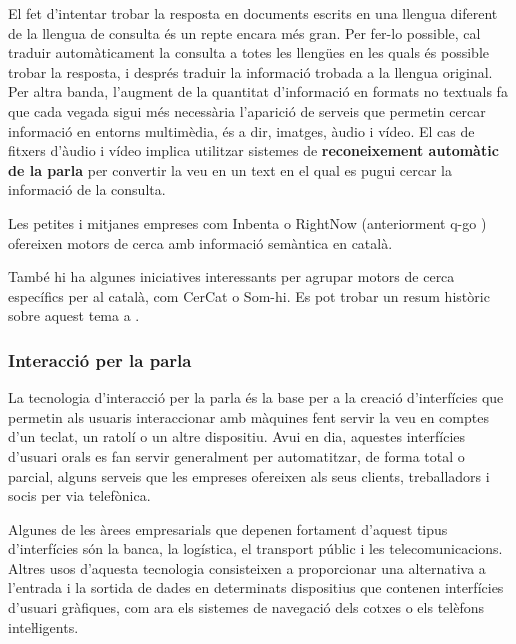 \begin{multicols}{2}
El fet d’intentar trobar la resposta en documents escrits en una llengua diferent de la llengua de consulta és un repte encara més gran. Per fer-lo possible, cal traduir automàticament la consulta a totes les llengües en les quals és possible trobar la resposta, i després traduir la informació trobada a la llengua original. Per altra banda, l’augment de la quantitat d’informació en formats no textuals fa que cada vegada sigui més necessària l’aparició de serveis que permetin cercar informació en entorns multimèdia, és a dir, imatges, àudio i vídeo. El cas de fitxers d’àudio i vídeo implica utilitzar sistemes de \textbf{reconeixement automàtic de la parla} per convertir la veu en un text en el qual es pugui cercar la informació de la consulta. 

Les petites i mitjanes empreses com Inbenta \cite{CAT-inbenta} o RightNow  (anteriorment q-go \cite{CAT-rightnow}) ofereixen motors de cerca amb informació semàntica en català.


També hi ha algunes iniciatives interessants per agrupar motors de cerca específics per al català, com CerCat o Som-hi\cite{CAT-cercadors}. Es pot trobar un resum històric sobre aquest tema a \cite{CAT-Resum-sobre-cercadors}.
  
\subsubsection{Interacció per la parla}

La tecnologia d’interacció per la parla és la base per a la creació d’interfícies que permetin als usuaris interaccionar amb màquines fent servir la veu en comptes d’un teclat, un ratolí o un altre dispositiu. Avui en dia, aquestes interfícies d’usuari orals es fan servir generalment per automatitzar, de forma total o parcial, alguns serveis que les empreses ofereixen als seus clients, treballadors i socis per via telefònica.

Algunes de les àrees empresarials que depenen fortament d’aquest tipus d’interfícies són la banca, la logística, el transport públic i les telecomunicacions. Altres usos d’aquesta tecnologia consisteixen a proporcionar una alternativa a l’entrada i la sortida de dades en determinats dispositius que contenen interfícies d’usuari gràfiques, com ara els sistemes de navegació dels cotxes o els telèfons inteŀligents. 


\end{multicols}
